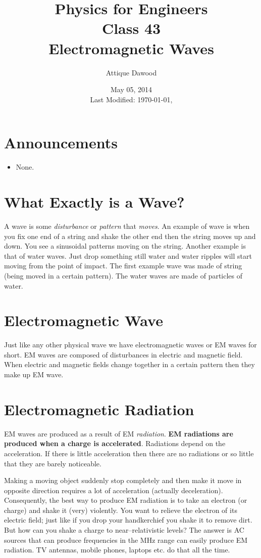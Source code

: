 \documentclass[12pt,a4paper]{article}
\title{\vspace{-3cm}Physics for Engineers\\Class 43\\Electromagnetic Waves}
\author{Attique Dawood}
\date{May 05, 2014\\[0.2cm] Last Modified: \today, \currenttime}
\begin{document}
\maketitle
\section{Announcements}
\begin{itemize}
\item None.
\end{itemize}
\section{What Exactly is a Wave?}
A wave is some \textit{disturbance} or \textit{pattern} that \textit{moves}. An example of wave is when you fix one end of a string and shake the other end then the string moves up and down. You see a sinusoidal patterns moving on the string. Another example is that of water waves. Just drop something still water and water ripples will start moving from the point of impact. The first example wave was made of string (being moved in a certain pattern). The water waves are made of particles of water.
\section{Electromagnetic Wave}
Just like any other physical wave we have electromagnetic waves or EM waves for short. EM waves are composed of disturbances in electric and magnetic field. When electric and magnetic fields change together in a certain pattern then they make up EM wave.
\section{Electromagnetic Radiation}
EM waves are produced as a result of EM \textit{radiation}. \textbf{EM radiations are produced when a charge is accelerated}. Radiations depend on the acceleration. If there is little acceleration then there are no radiations or so little that they are barely noticeable.

Making a moving object suddenly stop completely and then make it move in opposite direction requires a lot of acceleration (actually deceleration). Consequently, the best way to produce EM radiation is to take an electron (or charge) and shake it (very) violently. You want to relieve the electron of its electric field; just like if you drop your handkerchief you shake it to remove dirt. But how can you shake a charge to near--relativistic levels? The answer is AC sources that can produce frequencies in the MHz range can easily produce EM radiation. TV antennas, mobile phones, laptops etc. do that all the time.
\end{document}
